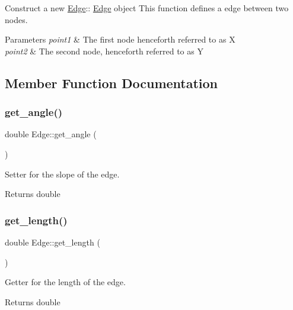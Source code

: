 Construct a new \hyperlink{classEdge}{Edge}\+:\+: \hyperlink{classEdge}{Edge} object This function defines a edge between two nodes. 


\begin{DoxyParams}{Parameters}
{\em point1} & The first node henceforth referred to as X \\
\hline
{\em point2} & The second node, henceforth referred to as Y \\
\hline
\end{DoxyParams}


\subsection{Member Function Documentation}
\mbox{\label{classEdge_a9a8aef5515cc448ee630382e028b56e6}} 
\subsubsection{\texorpdfstring{get\+\_\+angle()}{get\_angle()}}
{\footnotesize\ttfamily double Edge\+::get\+\_\+angle (\begin{DoxyParamCaption}{ }\end{DoxyParamCaption})}



Setter for the slope of the edge. 

\begin{DoxyReturn}{Returns}
double 
\end{DoxyReturn}
\mbox{\label{classEdge_a4006dc75fc999a1d004601ff3c6dab35}} 
\subsubsection{\texorpdfstring{get\+\_\+length()}{get\_length()}}
{\footnotesize\ttfamily double Edge\+::get\+\_\+length (\begin{DoxyParamCaption}{ }\end{DoxyParamCaption})}



Getter for the length of the edge. 

\begin{DoxyReturn}{Returns}
double 
\end{DoxyReturn}
\mbox{\label{classEdge_a2ff0f1ff41d7dbf210a634dbfa9cca43}} 
